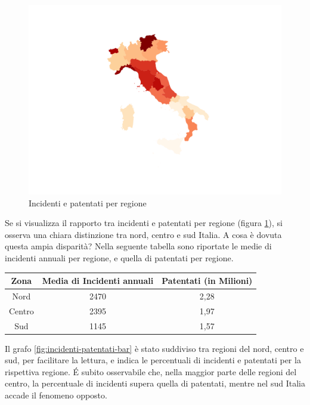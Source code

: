 \documentclass[a4paper]{report}
\begin{document}
\begin{figure}
    \includegraphics[width=\linewidth]{../src/incidenti/incidenti_aci/mappe_regioni/incidenti_patenti.png}
    \caption{Incidenti e patentati per regione}
    \label{fig:incidenti-patentati}
\end{figure}

Se si visualizza il rapporto tra incidenti e patentati per regione (figura \ref{fig:incidenti-patentati}), 
si osserva una chiara distinzione tra nord, centro e sud Italia.
A cosa è dovuta questa ampia disparità?
Nella seguente tabella sono riportate le medie di incidenti annuali per regione, 
e quella di patentati per regione.

\begin{center}
    \def\arraystretch{1.5}%
    \begin{tabular}{ |c|c|c| } 
    \hline
    Zona & Media di Incidenti annuali & Patentati (in Milioni) \\ 
    \hline
    \rowcolor{TableGray}
    Nord    &   2470 &   2,28 \\ 
    Centro  &   2395 &   1,97 \\ 
    \rowcolor{TableGray}
    Sud     &   1145 &   1,57 \\ 
    \hline
    \end{tabular}
\end{center}

Il grafo \ref{fig:incidenti-patentati-bar} è stato suddiviso tra regioni del nord, centro e sud, per facilitare 
la lettura, e indica le percentuali di incidenti e patentati per la rispettiva regione. 
\'E subito osservabile che, nella maggior parte delle regioni del centro, la percentuale di incidenti 
supera quella di patentati, mentre nel sud Italia accade il fenomeno opposto.
\end{document}
